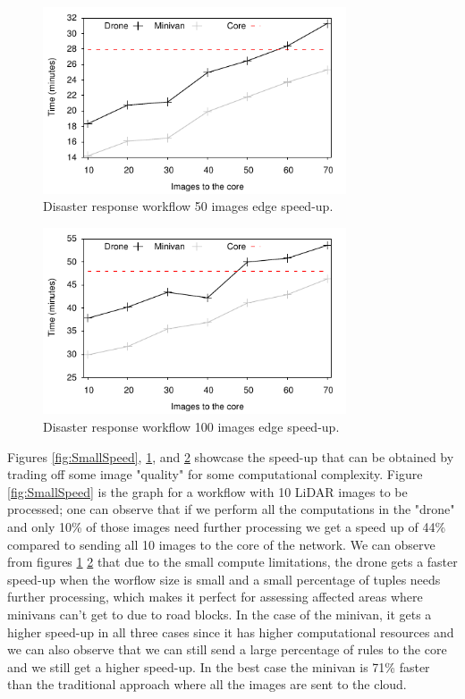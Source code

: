 \begin{figure}[H]
  \centering
  \includegraphics[width=0.8\textwidth]{Results/MediumSpeed}
  \caption{Disaster response workflow 50 images edge speed-up.}
  \label{fig:MediumSpeed}
\end{figure}

\begin{figure}[H]
  \centering
  \includegraphics[width=0.8\textwidth]{Results/BigSpeed}
  \caption{Disaster response workflow 100 images edge speed-up.}
  \label{fig:BigSpeed}
\end{figure}

Figures \ref{fig:SmallSpeed}, \ref{fig:MediumSpeed}, and \ref{fig:BigSpeed} showcase the speed-up that can be obtained by trading off some image "quality" for some computational complexity. Figure \ref{fig:SmallSpeed} is the graph for a workflow with 10 LiDAR images to be processed; one can observe that if we perform all the computations in the "drone" and only 10\% of those images need further processing we get a speed up of 44\% compared to sending all 10 images to the core of the network. We can observe from figures \ref{fig:MediumSpeed} \ref{fig:BigSpeed} that due to the small compute limitations, the drone gets a faster speed-up when the worflow size is small and a small percentage of tuples needs further processing, which makes it perfect for assessing affected areas where minivans can't get to due to road blocks. In the case of the minivan, it gets a higher speed-up in all three cases since it has higher computational resources and we can also observe that we can still send a large percentage of rules to the core and we still get a higher speed-up. In the best case the minivan is 71\% faster than the traditional approach where all the images are sent to the cloud.

